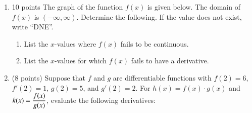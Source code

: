 \documentclass[12pt]{article}
\begin{document}
\newpage
\begin{enumerate}
\item{10 points} The graph of the function $f(x)$ is given below. The domain of $f(x)$ is $(-\infty,\infty).$ 
Determine the following. If the value does not exist, write ``DNE''.
\begin{center}
 \end{center}

\newcommand{\ans}{\rule{1.5cm}{.5 pt}}
\newlength{\mysep} 
\setlength{\mysep}{0.3in}
\begin{enumerate}
\vspace{1cm}
\item List the $x$-values where $f(x)$ fails to be continuous.\\
\vfill
\item List the $x$-values for which $f(x)$ fails to have a derivative.\\\vfill
\vspace{\mysep}
\end{enumerate}
\newpage
\item (8 points) Suppose that $f$ and $g$ are differentiable functions with $f(2)=6$, $f'(2)=1$, $g(2)=5$, and $g'(2)=2$. For $h(x)=f(x)\cdot g(x)$ and $k(x)=\large{\displaystyle{\frac{f(x)}{g(x)}}}$, evaluate the following derivatives:\\ 


\end{enumerate}
\end{document}
